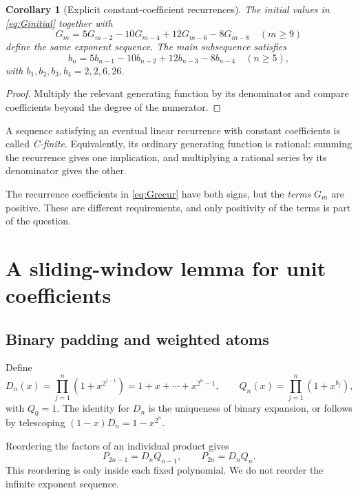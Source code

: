 \documentclass[11pt]{article}
\newtheorem{corollary}[theorem]{Corollary}
\theoremstyle{definition}\newtheorem{definition}[theorem]{Definition}
\theoremstyle{remark}\newtheorem{remark}[theorem]{Remark}
\begin{document}
\begin{corollary}[Explicit constant-coefficient recurrences]\label{cor:recurrences}
The initial values in \eqref{eq:Ginitial} together with
\begin{equation}\label{eq:Grecur}
 G_m=5G_{m-2}-10G_{m-4}+12G_{m-6}-8G_{m-8}\quad(m\geq9)
\end{equation}
define the same exponent sequence. The main subsequence satisfies
\begin{equation}\label{eq:Brecur}
 b_n=5b_{n-1}-10b_{n-2}+12b_{n-3}-8b_{n-4}\quad(n\geq5),
\end{equation}
with $b_1,b_2,b_3,b_4=2,2,6,26$.
\end{corollary}
\begin{proof}
Multiply the relevant generating function by its denominator and compare coefficients beyond the degree of the numerator.
\end{proof}

A sequence satisfying an eventual linear recurrence with constant coefficients is called \emph{C-finite}. Equivalently, its ordinary generating function is rational: summing the recurrence gives one implication, and multiplying a rational series by its denominator gives the other.

The recurrence coefficients in \eqref{eq:Grecur} have both signs, but the \emph{terms} $G_m$ are positive. These are different requirements, and only positivity of the terms is part of the question.

\section{A sliding-window lemma for unit coefficients}

\subsection{Binary padding and weighted atoms}

Define
\begin{equation}\label{eq:DQ}
 D_n(x)=\prod_{j=1}^n(1+x^{2^{j-1}})
       =1+x+\cdots+x^{2^n-1},\qquad
 Q_n(x)=\prod_{j=1}^n(1+x^{b_j}),
\end{equation}
with $Q_0=1$. The identity for $D_n$ is the uniqueness of binary expansion, or follows by telescoping $(1-x)D_n=1-x^{2^n}$.

Reordering the factors of an individual product gives
\begin{equation}\label{eq:factorization}
 P_{2n-1}=D_nQ_{n-1},\qquad P_{2n}=D_nQ_n.
\end{equation}
This reordering is only inside each fixed polynomial. We do not reorder the infinite exponent sequence.
\end{document}
